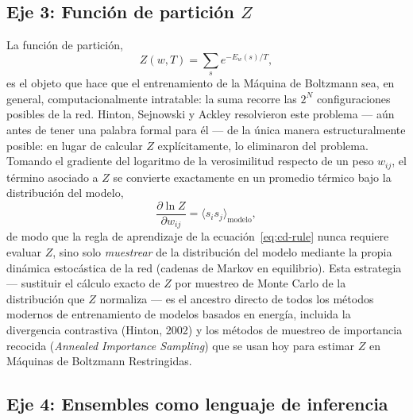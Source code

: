 \documentclass[12pt]{article}
\begin{document}
\subsection{Eje 3: Función de partición $Z$}

La función de partición,
\begin{equation}
Z(w,T) = \sum_{s} e^{-E_w(s)/T},
\end{equation}
es el objeto que hace que el entrenamiento de la Máquina de Boltzmann sea, en general, computacionalmente intratable: la suma recorre las $2^N$ configuraciones posibles de la red. Hinton, Sejnowski y Ackley resolvieron este problema --- aún antes de tener una palabra formal para él --- de la única manera estructuralmente posible: en lugar de calcular $Z$ explícitamente, lo eliminaron del problema. Tomando el gradiente del logaritmo de la verosimilitud respecto de un peso $w_{ij}$, el término asociado a $Z$ se convierte exactamente en un promedio térmico bajo la distribución del modelo,
\begin{equation}
\frac{\partial \ln Z}{\partial w_{ij}} = \langle s_i s_j\rangle_{\text{modelo}},
\end{equation}
de modo que la regla de aprendizaje de la ecuación~\eqref{eq:cd-rule} nunca requiere evaluar $Z$, sino solo \emph{muestrear} de la distribución del modelo mediante la propia dinámica estocástica de la red (cadenas de Markov en equilibrio). Esta estrategia --- sustituir el cálculo exacto de $Z$ por muestreo de Monte Carlo de la distribución que $Z$ normaliza --- es el ancestro directo de todos los métodos modernos de entrenamiento de modelos basados en energía, incluida la divergencia contrastiva (Hinton, 2002) y los métodos de muestreo de importancia recocida (\emph{Annealed Importance Sampling}) que se usan hoy para estimar $Z$ en Máquinas de Boltzmann Restringidas.

\subsection{Eje 4: Ensembles como lenguaje de inferencia}
\end{document}
